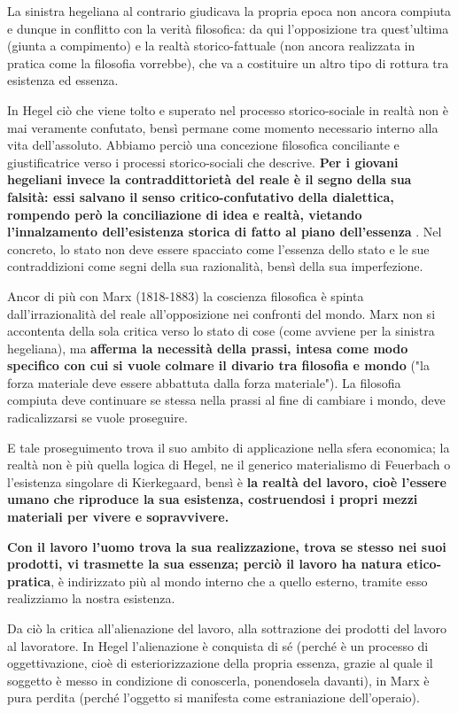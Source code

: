  La sinistra hegeliana al contrario giudicava la propria epoca non ancora compiuta e dunque in conflitto con la verità filosofica: da qui l'opposizione tra quest'ultima (giunta a compimento) e la realtà storico-fattuale (non ancora realizzata in pratica come la filosofia vorrebbe), che va a costituire un altro tipo di rottura tra esistenza ed essenza.
 
 In Hegel ciò che viene tolto e superato nel processo storico-sociale in realtà non è mai veramente confutato, bensì permane come momento necessario interno alla vita dell'assoluto. Abbiamo perciò una concezione filosofica conciliante e giustificatrice verso i processi storico-sociali che descrive. \textbf{Per i giovani hegeliani invece la contraddittorietà del reale è il segno della sua falsità: essi salvano il senso critico-confutativo della dialettica, rompendo però la conciliazione di idea e realtà, vietando l'innalzamento dell'esistenza storica di fatto al piano dell'essenza }. Nel concreto, lo stato non deve essere spacciato come l'essenza dello stato e le sue contraddizioni come segni della sua razionalità, bensì della sua imperfezione.
 
 Ancor di più con Marx (1818-1883) la coscienza filosofica è spinta dall'irrazionalità del reale all'opposizione nei confronti del mondo. Marx non si accontenta della sola critica verso lo stato di cose (come avviene per la sinistra hegeliana), ma \textbf{afferma la necessità della prassi, intesa come modo specifico con cui si vuole colmare il divario tra filosofia e mondo} ("la forza materiale deve essere abbattuta dalla forza materiale"). La filosofia compiuta deve continuare se stessa nella prassi al fine di cambiare i mondo, deve radicalizzarsi se vuole proseguire.
 
 E tale proseguimento trova il suo ambito di applicazione nella sfera economica; la realtà non è più quella logica di Hegel, ne il generico materialismo di Feuerbach o l'esistenza singolare di Kierkegaard, bensì è \textbf{la realtà del lavoro, cioè l'essere umano che riproduce la sua esistenza, costruendosi i propri mezzi materiali per vivere e sopravvivere.}
 
 \textbf{Con il lavoro l'uomo trova la sua realizzazione, trova se stesso nei suoi prodotti, vi trasmette la sua essenza; perciò il lavoro ha natura etico-pratica}, è indirizzato più al mondo interno che a quello esterno, tramite esso realizziamo la nostra esistenza.
 
 Da ciò la critica all'alienazione del lavoro, alla sottrazione dei prodotti del lavoro al lavoratore. In Hegel l'alienazione è conquista di sé (perché è un processo di oggettivazione, cioè di esteriorizzazione della propria essenza, grazie al quale il soggetto è messo in condizione di conoscerla, ponendosela davanti), in Marx è pura perdita (perché l'oggetto si manifesta come estraniazione dell'operaio).
 
